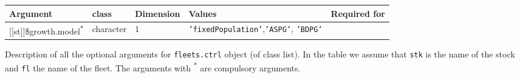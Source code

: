\begin{landscape}
\begin{table}[!ht]
\begin{footnotesize}
\begin{threeparttable}
      \begin{tabular}{lllll} %
        \hline 
        Argument & class & Dimension & Values & Required for \\
        \hline
        {[[st]]}\$growth.model\textsuperscript{*} & character & 1 & \texttt{'fixedPopulation'},\texttt{'ASPG'}, \texttt{'BDPG'} &   \\
        \hline
      \end{tabular}
      
    \end{threeparttable}
  \end{footnotesize}

\end{table}


\begin{table}[!ht]

  \centering
  \begin{footnotesize}
    
    \caption{Description of all the optional arguments for \texttt{fleets.ctrl} object (of class list).
    In the table we assume that \texttt{stk} is the name of the stock and \texttt{fl} the name of the fleet.
    The arguments with \textsuperscript{*} are compulsory arguments.}
    
    \label{tb:A3.table3}
    
    \begin{threeparttable}
    

\end{threeparttable}
\end{footnotesize}
\end{table}
\end{landscape}

